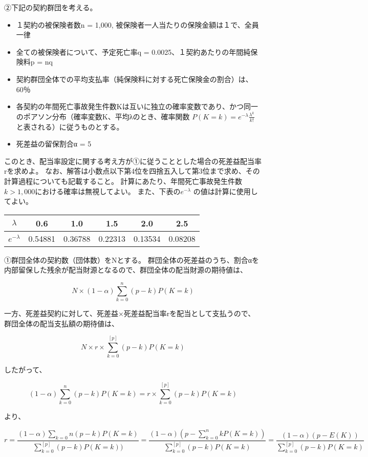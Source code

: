 \documentclass[report,gutter=10mm,fore-edge=10mm,uplatex,dvipdfmx]{jlreq}
\begin{document}
②下記の契約群団を考える。
\begin{itemize}
\item[] １契約の被保険者数n = 1,000,  被保険者一人当たりの保険金額は１で、全員一律
\item[] 全ての被保険者について、予定死亡率q = 0.0025、１契約あたりの年間純保険料p = nq
\item[] 契約群団全体での平均支払率（純保険料に対する死亡保険金の割合）は、60％
\item[] 各契約の年間死亡事故発生件数Kは互いに独立の確率変数であり、かつ同一のポアソン分布（確率変数K、平均λのとき、確率関数 $P(K = k) = e^{-\lambda} \frac{\lambda^k}{k!}$ と表される）に従うものとする。
\item[] 死差益の留保割合α = 5%
\end{itemize}

このとき、配当率設定に関する考え方が①に従うこととした場合の死差益配当率rを求めよ。
なお、解答は小数点以下第4位を四捨五入して第3位まで求め、その計算過程についても記載すること。
計算にあたり、年間死亡事故発生件数$k > 1,000$における確率は無視してよい。
また、下表の$e^{-\lambda}$ の値は計算に使用してよい。
\vspace{1zh}

\begin{tabular}{|c|c|c|c|c|c|}
 \hline {}
$\lambda$& 0.6& 1.0& 1.5& 2.0& 2.5\\ \hline {}
$e^{-\lambda}$& 0.54881& 0.36788& 0.22313& 0.13534& 0.08208 \\ \hline
\end{tabular}
\answer{}
①群団全体の契約数（団体数）をNとする。
群団全体の死差益のうち、割合αを内部留保した残余が配当財源となるので、群団全体の配当財源の期待値は、

$$
N\times(1-\alpha)\sum\limits_{k=0}^{n}(p-k)P(K=k)
$$

一方、死差益契約に対して、死差益×死差益配当率rを配当として支払うので、群団全体の配当支払額の期待値は、

$$
N\times r \times \sum\limits_{k=0}^{[p]}(p-k)P(K=k)
$$

したがって、

$$
(1-\alpha)\sum\limits_{k=0}^{n}(p-k)P(K=k) = r \times \sum\limits_{k=0}^{[p]}(p-k)P(K=k)
$$

より、

$$
r=\frac{(1-\alpha)\sum\limits_{k=0}{n}(p-k)P(K=k)}{\sum\limits_{k=0}^{[p]}(p-k)P(K=k))}
=\frac{(1-\alpha)\left(p-\sum\limits_{k=0}^{n} k P(K=k)\right)}{\sum\limits_{k=0}^{[p]}(p-k)P(K=k)}
=\frac{(1-\alpha)(p-E(K))}{\sum\limits_{k=0}^{[p]}(p-k)P(K=k)}
$$
\end{document}
